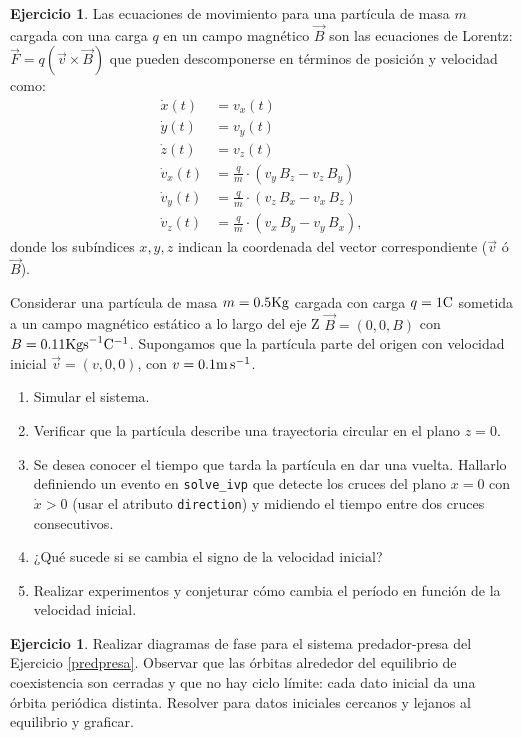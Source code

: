 \documentclass[12pt, a4paper]{amsbook}
\theoremstyle{remark}
\theoremstyle{definition}
\newtheorem{ejer}[teo]{Ejercicio}
\numberwithin{section}{chapter}
\numberwithin{subsection}{section}
\numberwithin{equation}{section}
\numberwithin{figure}{chapter}
\begin{document}
\begin{ejer}\label{particula-cargada}
Las ecuaciones de movimiento para una partícula de masa $m$ cargada con una carga $q$ en un campo magnético $\vec{B}$ son las ecuaciones de Lorentz: $\vec{F} = q(\vec{v}\times \vec{B})$ que pueden descomponerse en términos de posición y velocidad como:
\begin{align*}
    \dot{x}(t) &= v_x(t) \\
    \dot{y}(t) &= v_y(t) \\
    \dot{z}(t) &= v_z(t) \\
    \dot{v}_x(t) &= \frac{q}{m}\cdot (v_y\,B_z-v_z\,B_y)\\
    \dot{v}_y(t) &= \frac{q}{m}\cdot (v_z\,B_x-v_x\,B_z)\\
    \dot{v}_z(t) &= \frac{q}{m}\cdot (v_x\,B_y-v_y\,B_x),
\end{align*}
donde los subíndices $x,y,z$ indican la coordenada del vector correspondiente ($\vec{v}$ ó $\vec{B}$). 

Considerar una partícula de masa $m = 0.5 {\rm Kg}$ cargada con carga $q = 1 {\rm C}$ sometida a un campo magnético estático a lo largo del eje Z $\vec{B} = (0,0,B)$ con $B = 0.11 {\rm Kg s}^{-1}{\rm C}^{-1}$. Supongamos que la partícula parte del origen con velocidad inicial $\vec{v}=(v,0,0)$, con $v = 0.1 {\rm m\,s}^{-1}$.
\begin{enumerate}
    \item Simular el sistema.
    \item Verificar que la partícula describe una trayectoria circular en el plano $z=0$.
    \item Se desea conocer el tiempo que tarda la partícula en dar una vuelta. Hallarlo definiendo un evento en \lstinline{solve_ivp} que detecte los cruces del plano $x=0$ con $\dot x>0$ (usar el atributo \lstinline{direction}) y midiendo el tiempo entre dos cruces consecutivos.
    \item ¿Qué sucede si se cambia el signo de la velocidad inicial?
    \item Realizar experimentos y conjeturar cómo cambia el período en función de la velocidad inicial. 
\end{enumerate}
\end{ejer}



\begin{ejer} Realizar diagramas de fase para el sistema predador-presa del Ejercicio \ref{predpresa}. Observar que las órbitas alrededor del equilibrio de coexistencia son cerradas y que no hay ciclo límite: cada dato inicial da una órbita periódica distinta. Resolver para datos iniciales cercanos y lejanos al equilibrio y graficar.
\end{ejer}
\end{document}
